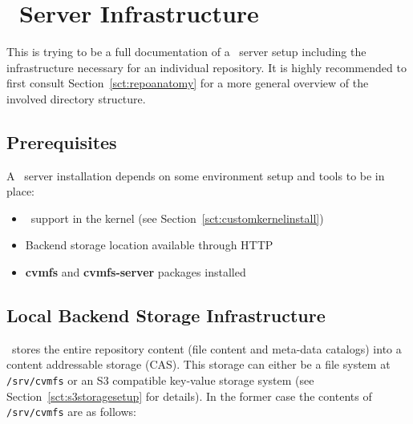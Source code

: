 \chapter{\cvmfs\ Server Infrastructure}
\label{apx:serverinfrastructure}

This is trying to be a full documentation of a \cvmfs\ server setup including the infrastructure necessary for an individual repository.
It is highly recommended to first consult Section~\ref{sct:repoanatomy} for a more general overview of the involved directory structure.

\section{Prerequisites}
A \cvmfs\ server installation depends on some environment setup and tools to be in place:
\begin{itemize}
\item \aufs\ support in the kernel (see Section~\ref{sct:customkernelinstall})
\item Backend storage location available through HTTP
\item \textbf{cvmfs} and \textbf{cvmfs-server} packages installed
\end{itemize}

\section{Local Backend Storage Infrastructure}
\cvmfs\ stores the entire repository content (file content and meta-data catalogs) into a content addressable storage (CAS).
This storage can either be a file system at \texttt{/srv/cvmfs} or an S3 compatible key-value storage system (see Section~\ref{sct:s3storagesetup} for details).
In the former case the contents of \texttt{/srv/cvmfs} are as follows:


